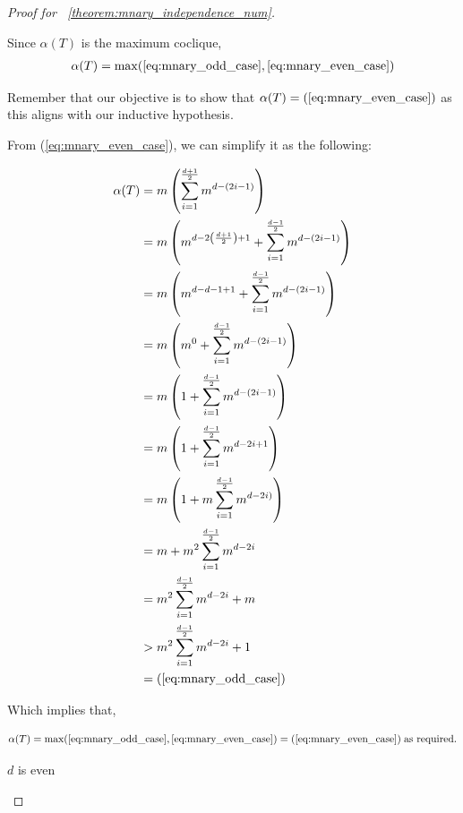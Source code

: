 \documentclass{amsart}
\theoremstyle{definition}
\begin{document}
\begin{proof}[Proof for ~\ref{theorem:mnary_independence_num}]
\begin{caseof}
\begin{subcaseof}
		\end{subcaseof}

		Since $\alpha(T)$ is the maximum coclique,
		\begin{align*}
			\alpha(T) = \max(\ref{eq:mnary_odd_case}, \ref{eq:mnary_even_case})
		\end{align*}

		Remember that our objective is to show that $\alpha(T) = (\ref{eq:mnary_even_case})$ as this aligns with our inductive hypothesis.

		From (\ref{eq:mnary_even_case}), we can simplify it as the following:

		\begin{align*}
			\alpha(T) & = m\left(\displaystyle\sum_{i = 1}^{\frac{d + 1}{2}}m^{d - (2i - 1)}\right)  \\
				  & = m\left(m^{d - 2\left(\frac{d + 1}{2}\right) + 1} + \displaystyle\sum_{i = 1}^{\frac{d - 1}{2}}m^{d - (2i - 1)}\right)\\
				  & = m\left(m^{d - d - 1 + 1} + \displaystyle\sum_{i = 1}^{\frac{d - 1}{2}}m^{d - (2i - 1)}\right)\\
				  & = m\left(m^0 + \displaystyle\sum_{i = 1}^{\frac{d - 1}{2}}m^{d - (2i - 1)}\right)\\
				  & = m\left(1 + \displaystyle\sum_{i = 1}^{\frac{d - 1}{2}}m^{d - (2i - 1)}\right)\\
				  & = m\left(1 + \displaystyle\sum_{i = 1}^{\frac{d - 1}{2}}m^{d - 2i + 1}\right)\\
				  & = m\left(1 + m\displaystyle\sum_{i = 1}^{\frac{d - 1}{2}}m^{d - 2i)}\right)\\
				  & = m + m^2\displaystyle\sum_{i = 1}^{\frac{d - 1}{2}}m^{d - 2i}\\
				  & = m^2\displaystyle\sum_{i = 1}^{\frac{d - 1}{2}}m^{d - 2i} + m \\
				  & > m^2\displaystyle\sum_{i = 1}^{\frac{d - 1}{2}}m^{d - 2i} + 1 \\
				  & = (\ref{eq:mnary_odd_case})
		\end{align*}

		Which implies that,

		\begin{align*}
			\alpha(T) = \max(\ref{eq:mnary_odd_case}, \ref{eq:mnary_even_case}) = (\ref{eq:mnary_even_case})\; \text{as required.}
		\end{align*}

	\item $d$ is even \\


\end{caseof}
\end{proof}
\end{document}
